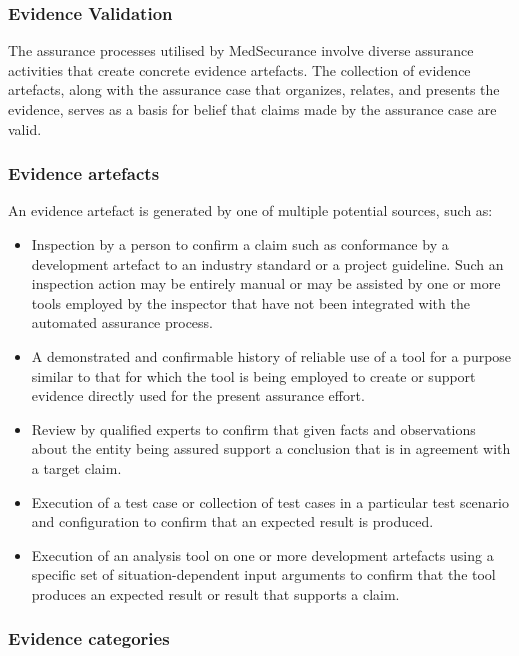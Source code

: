 \documentclass[12pt,twoside,a4paper]{article}
\begin{document}
\hypertarget{evidence-validation}{%
\subsubsection{Evidence Validation}\label{evidence-validation}}

The assurance processes utilised by MedSecurance involve diverse assurance activities that create concrete evidence artefacts. The collection of evidence artefacts, along with the assurance case that organizes, relates, and presents the evidence, serves as a basis for belief that claims made by the assurance case are valid.

\hypertarget{evidence-artefacts}{%
\subsubsection{Evidence artefacts}\label{evidence-artefacts}}

An evidence artefact is generated by one of multiple potential sources, such as:

\begin{itemize}
\item
  Inspection by a person to confirm a claim such as conformance by a development artefact to an industry standard or a project guideline. Such an inspection action may be entirely manual or may be assisted by one or more tools employed by the inspector that have not been integrated with the automated assurance process.
\item
  A demonstrated and confirmable history of reliable use of a tool for a purpose similar to that for which the tool is being employed to create or support evidence directly used for the present assurance effort.
\item
  Review by qualified experts to confirm that given facts and observations about the entity being assured support a conclusion that is in agreement with a target claim.
\item
  Execution of a test case or collection of test cases in a particular test scenario and configuration to confirm that an expected result is produced.
\item
  Execution of an analysis tool on one or more development artefacts using a specific set of situation-dependent input arguments to confirm that the tool produces an expected result or result that supports a claim.
\end{itemize}

\hypertarget{evidence-categories}{%
\subsubsection{Evidence categories}\label{evidence-categories}}
\end{document}
